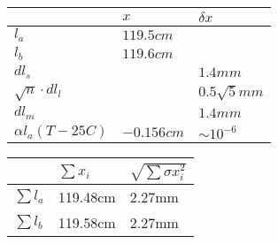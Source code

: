 \begin{tabular}{| l | l | l |}
\hline
 & $x$ & $\delta x$ \\
\hline
$l_a$                 & $119.5cm$ &    \\             
$l_b$                 & $119.6cm$ &    \\        
$dl_s$                &     & $1.4mm$   \\             
$\sqrt{n}\cdot dl_l$  &     & $0.5\sqrt{5}mm$   \\                  
$dl_m$                &     & $1.4mm$   \\                  
$\alpha l_a (T-25C)$  & $-0.156cm$ & $\sim 10^{-6}$   \\ 
\hline                

\end{tabular}

\begin{tabular}{| p{} | l | l |}
\hline
& $\sum x_i$ & $\sqrt {\sum \sigma x_i^2 }$ \\
\hline
$\sum l_a$ & 119.48cm & 2.27mm \\
$\sum l_b$ & 119.58cm & 2.27mm \\
\hline   
\end{tabular}